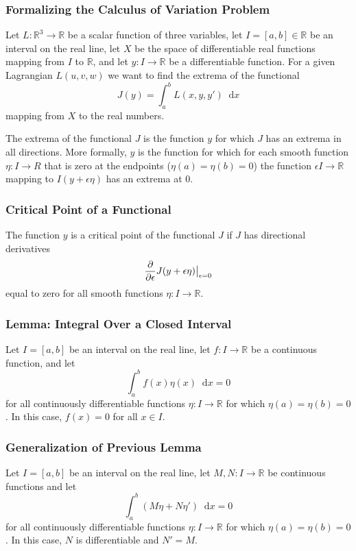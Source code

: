\documentclass[11pt, a4paper]{article}
\newcommand{\diff}{\mathop{}\!\mathrm{d}} %
\newcommand{\R}{\mathbb{R}} %
\begin{document}
\subsubsection{Formalizing the Calculus of Variation Problem}
Let $ L : \R^3 \to \R $ be a scalar function of three variables, let $ I = [a, b] \in \R $ be an interval on the real line, let $ X $ be the space of differentiable real functions mapping from $ I $ to $ \R $, and let $ y: I \to \R $ be a differentiable function. For a given Lagrangian $ L(u, v, w) $ we want to find the extrema of the functional 
\begin{equation*}
	J(y) = \int_{a}^{b} L(x, y, y') \diff x
\end{equation*}
mapping from $ X $ to the real numbers.

The extrema of the functional $ J $ is the function $ y $ for which $ J $ has an extrema in all directions. More formally, $ y $ is the function for which for each smooth function $ \eta: I \to R $ that is zero at the endpoints ($ \eta(a) = \eta(b) = 0 $) the function $ \epsilon I \to \R $ mapping to $ I(y + \epsilon \eta) $ has an extrema at $ 0 $.

\subsubsection{Critical Point of a Functional}
The function $ y $ is a critical point of the functional $ J $ if $ J $ has directional derivatives
\begin{equation*}
	\pdv{}{\epsilon} J(y + \epsilon \eta) \big |_{\epsilon = 0}
\end{equation*}
equal to zero for all smooth functions $ \eta : I \to \R $.

\subsubsection{Lemma: Integral Over a Closed Interval}
Let $ I = [a, b] $ be an interval on the real line, let $ f : I \to \R $ be a continuous function, and let
\begin{equation*}
	\int_{a}^{b} f(x) \eta(x) \diff x = 0
\end{equation*}
for all continuously differentiable functions $ \eta : I \to \R $ for which $ \eta(a) = \eta(b) = 0 $. In this case, $ f(x) = 0 $ for all $ x \in I$.

\subsubsection{Generalization of Previous Lemma}
Let $ I = [a, b] $ be an interval on the real line, let $ M, N : I \to \R $ be continuous functions and let
\begin{equation*}
	\int_{a}^{b} (M \eta + N \eta') \diff x = 0
\end{equation*}
for all continuously differentiable functions $ \eta : I \to \R $ for which $ \eta(a) = \eta(b) = 0 $. In this case, $ N $ is differentiable and $ N' = M $.
\end{document}
